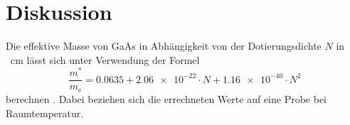 \section{Diskussion}
\label{sec:Diskussion}

Die effektive Masse von GaAs in Abhängigkeit von der Dotierungsdichte
$N$ in \si{\centi\meter} lässt sich unter Verwendung der
Formel
\begin{equation}
  \frac{m^*}{m_\text{e}} =
  \num{0.0635} + \num{2.06e-22} \cdot N + \num{1.16e-40} \cdot N^2
  \label{eqn:Theoriewert}
\end{equation}
berechnen \cite[7]{Nakwaski}. Dabei beziehen sich die errechneten Werte auf eine
Probe bei Raumtemperatur.
